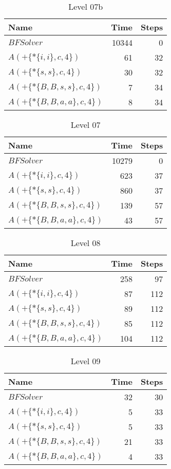 \begin{table} \centering \begin{tabular}{lrr}\toprule \textbf{ Name }
    & \textbf{ Time } & \textbf{ Steps }\\\midrule
    $BFSolver$ & 10344 & 0 \\
    $A(+\{*\{i,i\},c,4\})$ & 61 & 32 \\
    $A(+\{*\{s,s\},c,4\})$ & 30 & 32 \\
    $A(+\{*\{B,B,s,s\},c,4\})$ & 7 & 34 \\
    $A(+\{*\{B,B,a,a\},c,4\})$ & 8 & 34 \\
    \bottomrule \end{tabular} \caption{Level 07b}
  \label{tab:level_07b} \end{table}

\begin{table} \centering \begin{tabular}{lrr}\toprule \textbf{ Name }
    & \textbf{ Time } & \textbf{ Steps }\\\midrule
    $BFSolver$ & 10279 & 0 \\
    $A(+\{*\{i,i\},c,4\})$ & 623 & 37 \\
    $A(+\{*\{s,s\},c,4\})$ & 860 & 37 \\
    $A(+\{*\{B,B,s,s\},c,4\})$ & 139 & 57 \\
    $A(+\{*\{B,B,a,a\},c,4\})$ & 43 & 57 \\
    \bottomrule \end{tabular} \caption{Level 07}
  \label{tab:level_07} \end{table}

\begin{table} \centering \begin{tabular}{lrr}\toprule \textbf{ Name }
    & \textbf{ Time } & \textbf{ Steps }\\\midrule
    $BFSolver$ & 258 & 97 \\
    $A(+\{*\{i,i\},c,4\})$ & 87 & 112 \\
    $A(+\{*\{s,s\},c,4\})$ & 89 & 112 \\
    $A(+\{*\{B,B,s,s\},c,4\})$ & 85 & 112 \\
    $A(+\{*\{B,B,a,a\},c,4\})$ & 104 & 112 \\
    \bottomrule \end{tabular} \caption{Level 08}
  \label{tab:level_08} \end{table}

\begin{table} \centering \begin{tabular}{lrr}\toprule \textbf{ Name }
    & \textbf{ Time } & \textbf{ Steps }\\\midrule
    $BFSolver$ & 32 & 30 \\
    $A(+\{*\{i,i\},c,4\})$ & 5 & 33 \\
    $A(+\{*\{s,s\},c,4\})$ & 5 & 33 \\
    $A(+\{*\{B,B,s,s\},c,4\})$ & 21 & 33 \\
    $A(+\{*\{B,B,a,a\},c,4\})$ & 4 & 33 \\
    \bottomrule \end{tabular} \caption{Level 09}
  \label{tab:level_09} \end{table}

